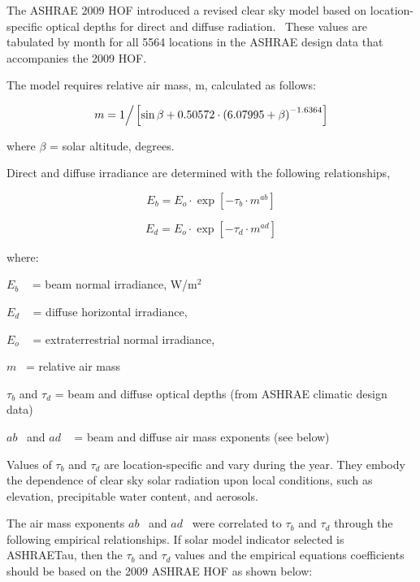 The ASHRAE 2009 HOF introduced a revised clear sky model based on location-specific optical depths for direct and diffuse radiation.~ These values are tabulated by month for all 5564 locations in the ASHRAE design data that accompanies the 2009 HOF.

The model requires relative air mass, m, calculated as follows:

\begin{equation}
m = {1 \mathord{\left/ {\vphantom {1 {\left[ {\sin \beta  + 0.50572 \cdot {{\left( {6.07995 + \beta } \right)}^{ - 1.6364}}} \right]}}} \right. } {\left[ {\sin \beta  + 0.50572 \cdot {{\left( {6.07995 + \beta } \right)}^{ - 1.6364}}} \right]}}
\end{equation}

where \(\beta\) = solar altitude, degrees.

Direct and diffuse irradiance are determined with the following relationships,

\begin{equation}
{E_b} = {E_o} \cdot \exp \left[ { - {\tau_b} \cdot {m^{ab}}} \right]
\end{equation}

\begin{equation}
{E_d} = {E_o} \cdot \exp \left[ { - {\tau_d} \cdot {m^{ad}}} \right]
\end{equation}

where:

\({E_b}\) ~ = beam normal irradiance, W/m\(^{2}\)

\({E_d}\) ~ = diffuse horizontal irradiance,

\({E_o}\) ~ = extraterrestrial normal irradiance,

\emph{\(m\)}~ = relative air mass

$\tau$\(_{b}\) and $\tau$\(_{d}\) = beam and diffuse optical depths (from ASHRAE climatic design data)

\(ab\) ~and \(ad\) ~ = beam and diffuse air mass exponents (see below)

Values of $\tau$\(_{b}\) and $\tau$\(_{d}\) are location-specific and vary during the year. They embody the dependence of clear sky solar radiation upon local conditions, such as elevation, precipitable water content, and aerosols.

The air mass exponents \(ab\) ~and \(ad\) ~were correlated to $\tau$\(_{b}\) and $\tau$\(_{d}\) through the following empirical relationships. If solar model indicator selected is ASHRAETau, then the $\tau$\(_{b}\) and $\tau$\(_{d}\) values and the empirical equations coefficients should be based on the 2009 ASHRAE HOF as shown below:

